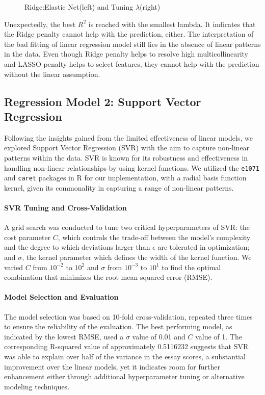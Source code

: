 \documentclass[8pt]{report}
\begin{document}
\begin{figure}[H]
    \caption{Ridge:Elastic Net(left) and Tuning $\lambda$(right)}
\label{fig:elastic_net_lambda}
\end{figure}
Unexpectedly, the best $R^2$ is reached with the smallest lambda. 
It indicates that the Ridge penalty cannot help with the prediction, either. 
The interpretation of the bad fitting of linear regression model still lies in the absence of linear patterns in the data.
Even though Ridge penalty helps to resolve high multicollinearity and LASSO penalty 
helps to select features, they cannot help with the prediction without the linear assumption.

\subsection{Regression Model 2: Support Vector Regression}
Following the insights gained from the limited effectiveness of linear models, we explored Support Vector Regression (SVR) with the aim to capture non-linear patterns within the data. SVR is known for its robustness and effectiveness in handling non-linear relationships by using kernel functions. We utilized the \texttt{e1071} and \texttt{caret} packages in R for our implementation, with a radial basis function kernel, given its commonality in capturing a range of non-linear patterns.

\paragraph{SVR Tuning and Cross-Validation}
A grid search was conducted to tune two critical hyperparameters of SVR: the cost parameter $C$, which controls the trade-off between the model's complexity and the degree to which deviations larger than $\epsilon$ are tolerated in optimization; and $\sigma$, the kernel parameter which defines the width of the kernel function. We varied $C$ from $10^{-2}$ to $10^{2}$ and $\sigma$ from $10^{-3}$ to $10^{1}$ to find the optimal combination that minimizes the root mean squared error (RMSE).

\paragraph{Model Selection and Evaluation}
The model selection was based on 10-fold cross-validation, repeated three times to ensure the reliability of the evaluation. The best performing model, as indicated by the lowest RMSE, used a $\sigma$ value of 0.01 and $C$ value of 1. The corresponding R-squared value of approximately 0.5116232 suggests that SVR was able to explain over half of the variance in the essay scores, a substantial improvement over the linear models, yet it indicates room for further enhancement either through additional hyperparameter tuning or alternative modeling techniques.
\end{document}
